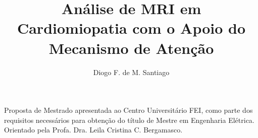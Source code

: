 \documentclass[rascunho,xindy,acronym,symbols]{package/fei}
\author{Diogo F. de M. Santiago }
\title{Análise de MRI em Cardiomiopatia com o Apoio do Mecanismo de Atenção }
\begin{document}
\maketitle
\begin{folhaderosto}
Proposta de Mestrado apresentada ao Centro Universitário FEI, como parte dos requisitos necessários para obtenção do título de Mestre em Engenharia Elétrica. Orientado pela Profa. Dra. Leila Cristina C. Bergamasco.
\end{folhaderosto}



% 






\listoffigures
\listoftables
\printglossaries

\tableofcontents







% 

\printbibliography

\end{document}
